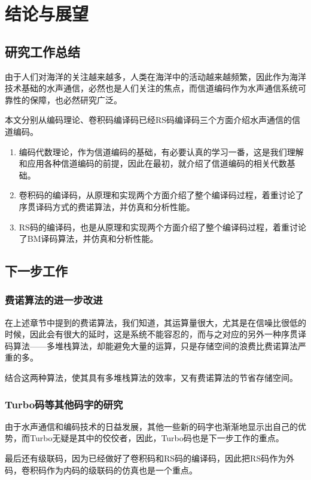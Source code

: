 %
\chapter{结论与展望}
\thispagestyle{empty}
\section{研究工作总结}
由于人们对海洋的关注越来越多，人类在海洋中的活动越来越频繁，因此作为海洋技术基础的水声通信，必然也是人们关注的焦点，而信道编码作为水声通信系统可靠性的保障，也必然研究广泛。

本文分别从编码理论、卷积码编译码已经RS码编译码三个方面介绍水声通信的信道编码。
\begin{enumerate}
  \item
    编码代数理论，作为信道编码的基础，有必要认真的学习一番，这是我们理解和应用各种信道编码的前提，因此在最初，就介绍了信道编码的相关代数基础。
  \item
    卷积码的编译码，从原理和实现两个方面介绍了整个编译码过程，着重讨论了序贯译码方式的费诺算法，并仿真和分析性能。
  \item
    RS码的编译码，也是从原理和实现两个方面介绍了整个编译码过程，着重讨论了BM译码算法，并仿真和分析性能。
\end{enumerate}
\section{下一步工作}
\subsection{费诺算法的进一步改进}
在上述章节中提到的费诺算法，我们知道，其运算量很大，尤其是在信噪比很低的时候，因此会有很大的延时，这是系统不能容忍的，而与之对应的另外一种序贯译码算法——多堆栈算法，却能避免大量的运算，只是存储空间的浪费比费诺算法严重的多。

结合这两种算法，使其具有多堆栈算法的效率，又有费诺算法的节省存储空间。
\subsection{Turbo码等其他码字的研究}
由于水声通信和编码技术的日益发展，其他一些新的码字也渐渐地显示出自己的优势，而Turbo无疑是其中的佼佼者，因此，Turbo码也是下一步工作的重点。

最后还有级联码，因为已经做好了卷积码和RS码的编译码，因此把RS码作为外码，卷积码作为内码的级联码的仿真也是一个重点。
%
